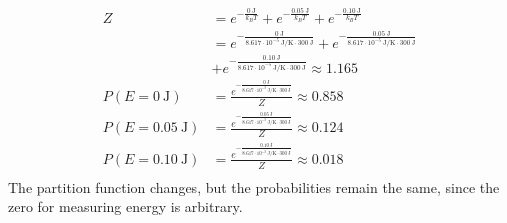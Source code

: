\documentclass{article}
\begin{document}
\begin{equation}
    \begin{split}
        Z & = e^{-\frac{0~\unit{\joule}}{k_BT}} + e^{-\frac{0.05~\unit{\joule}}{k_BT}} + e^{-\frac{0.10~\unit{\joule}}{k_BT}} \\
        & = e^{-\frac{0~\unit{\joule}}{8.617 \cdot 10^{-5}~\unit{\joule\per\kelvin} \cdot 300~\unit{\joule}}} + e^{-\frac{0.05~\unit{\joule}}{8.617 \cdot 10^{-5}~\unit{\joule\per\kelvin} \cdot 300~\unit{\joule}}} \\
        & + e^{-\frac{0.10~\unit{\joule}}{8.617 \cdot 10^{-5}~\unit{\joule\per\kelvin} \cdot 300~\unit{\joule}}} \approx 1.165 \\
        P\left(E = 0~\unit{\joule}\right) & = \frac{e^{-\frac{0~\unit{\joule}}{8.617 \cdot 10^{-5}~\unit{\joule\per\kelvin} \cdot 300~\unit{\joule}}}}{Z} \approx 0.858 \\
        P\left(E = 0.05~\unit{\joule}\right) & = \frac{e^{-\frac{0.05~\unit{\joule}}{8.617 \cdot 10^{-5}~\unit{\joule\per\kelvin} \cdot 300~\unit{\joule}}}}{Z} \approx 0.124 \\
        P\left(E = 0.10~\unit{\joule}\right) & = \frac{e^{-\frac{0.10~\unit{\joule}}{8.617 \cdot 10^{-5}~\unit{\joule\per\kelvin} \cdot 300~\unit{\joule}}}}{Z} \approx 0.018 \\
    \end{split}
\end{equation}
The partition function changes, but the probabilities remain the same, since the zero for measuring energy is arbitrary.

\clearpage
\end{document}
